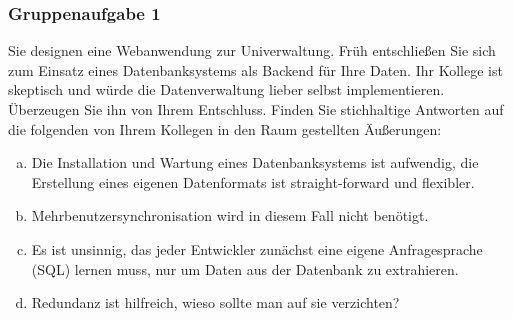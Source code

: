 \begin{frame}
	\frametitle{Gruppenaufgabe 1}
	\vspace{0.25cm}

	Sie designen eine Webanwendung zur Univerwaltung.
	Früh entschließen Sie sich zum Einsatz eines Datenbanksystems als
	Backend für Ihre Daten.
	Ihr Kollege ist skeptisch und würde die Datenverwaltung lieber selbst implementieren.
	Überzeugen Sie ihn von Ihrem Entschluss.
	Finden Sie stichhaltige Antworten auf die folgenden von Ihrem Kollegen in den Raum
	gestellten Äußerungen:
	\begin{enumerate}[a)]
		\item Die Installation und Wartung eines Datenbanksystems ist aufwendig,
		      die Erstellung eines eigenen Datenformats ist straight-forward und flexibler.
		\item Mehrbenutzersynchronisation wird in diesem Fall nicht benötigt.
		\item Es ist unsinnig, das jeder Entwickler zunächst eine eigene Anfragesprache (SQL)
		      lernen muss, nur um Daten aus der Datenbank zu extrahieren.
		\item Redundanz ist hilfreich, wieso sollte man auf sie verzichten?
	\end{enumerate}
\end{frame}


